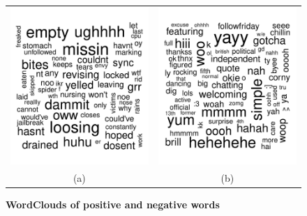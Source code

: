 \documentclass{sig-alternate}
\begin{document}
\begin{figure}[ht]
\begin{center}
\begin{tabular}{cc}
\includegraphics[scale=0.25]{negwords.pdf}
&
\includegraphics[scale=0.25]{poswords.pdf}\\
(a) & (b)  
\end{tabular}
\caption{\textbf{WordClouds of positive and negative words }}
\label{fig:scatter}
\end{center}
\end{figure}
\end{document}

